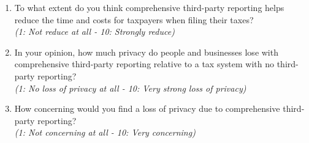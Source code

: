 \documentclass[11pt]{article}
\begin{document}
\begin{enumerate}[resume]
    \item To what extent do you think comprehensive third-party reporting helps reduce the time and costs for taxpayers when filing their taxes?\\
    \textit{(1: Not reduce at all - 10: Strongly reduce)}
    \item In your opinion, how much privacy do people and businesses lose with comprehensive third-party reporting relative to a tax system with no third-party reporting?\\
    \textit{(1: No loss of privacy at all - 10: Very strong loss of privacy)}
    \item How concerning would you find a loss of privacy due to comprehensive third-party reporting?\\
    \textit{(1: Not concerning at all - 10: Very concerning)}
\end{enumerate}
\end{document}
